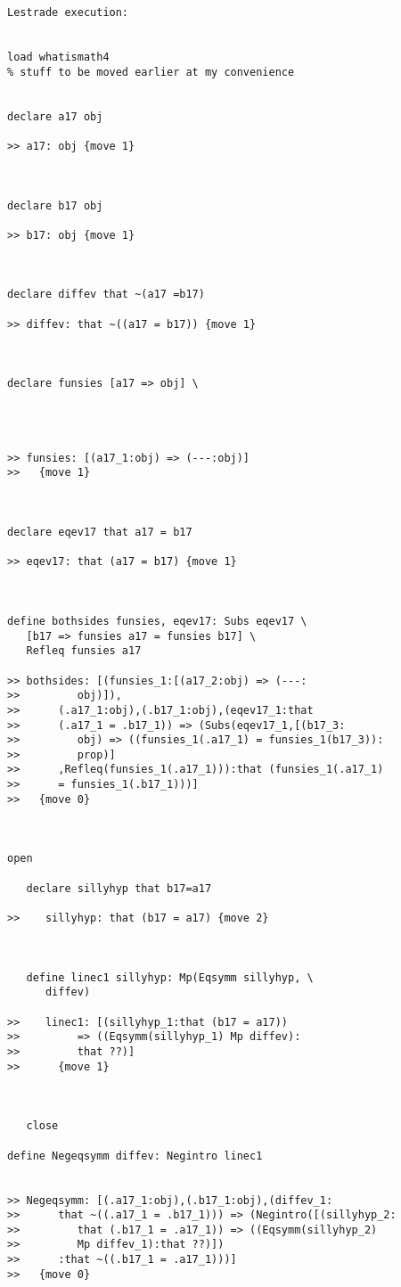 \documentclass[12pt]{article}
\begin{document}
\begin{verbatim}Lestrade execution:


load whatismath4
% stuff to be moved earlier at my convenience


declare a17 obj

>> a17: obj {move 1}



declare b17 obj

>> b17: obj {move 1}



declare diffev that ~(a17 =b17)

>> diffev: that ~((a17 = b17)) {move 1}



declare funsies [a17 => obj] \
   



>> funsies: [(a17_1:obj) => (---:obj)]
>>   {move 1}



declare eqev17 that a17 = b17

>> eqev17: that (a17 = b17) {move 1}



define bothsides funsies, eqev17: Subs eqev17 \
   [b17 => funsies a17 = funsies b17] \
   Refleq funsies a17

>> bothsides: [(funsies_1:[(a17_2:obj) => (---:
>>         obj)]),
>>      (.a17_1:obj),(.b17_1:obj),(eqev17_1:that
>>      (.a17_1 = .b17_1)) => (Subs(eqev17_1,[(b17_3:
>>         obj) => ((funsies_1(.a17_1) = funsies_1(b17_3)):
>>         prop)]
>>      ,Refleq(funsies_1(.a17_1))):that (funsies_1(.a17_1)
>>      = funsies_1(.b17_1)))]
>>   {move 0}



open

   declare sillyhyp that b17=a17

>>    sillyhyp: that (b17 = a17) {move 2}



   define linec1 sillyhyp: Mp(Eqsymm sillyhyp, \
      diffev)

>>    linec1: [(sillyhyp_1:that (b17 = a17))
>>         => ((Eqsymm(sillyhyp_1) Mp diffev):
>>         that ??)]
>>      {move 1}



   close

define Negeqsymm diffev: Negintro linec1


>> Negeqsymm: [(.a17_1:obj),(.b17_1:obj),(diffev_1:
>>      that ~((.a17_1 = .b17_1))) => (Negintro([(sillyhyp_2:
>>         that (.b17_1 = .a17_1)) => ((Eqsymm(sillyhyp_2)
>>         Mp diffev_1):that ??)])
>>      :that ~((.b17_1 = .a17_1)))]
>>   {move 0}




\end{verbatim}
\end{document}

